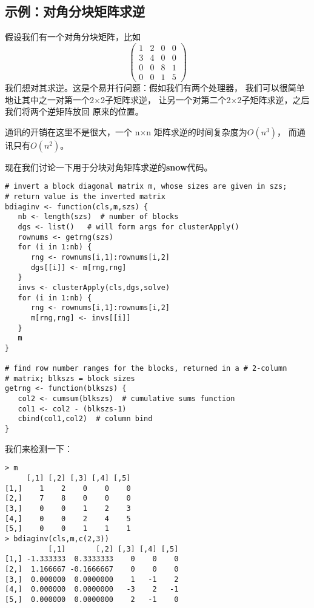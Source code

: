 \subsection{示例：对角分块矩阵求逆}
\label{blkd}

假设我们有一个对角分块矩阵，比如
$$
\left (
   \begin{array}{cccc}
   1 & 2 & 0 & 0 \\
   3 & 4 & 0 & 0 \\
   0 & 0 & 8 & 1 \\
   0 & 0 & 1 & 5
   \end{array}
\right )
$$
我们想对其求逆。这是个易并行问题：假如我们有两个处理器，
我们可以很简单地让其中之一对第一个2$\times$2子矩阵求逆，
让另一个对第二个2$\times$2子矩阵求逆，之后我们将两个逆矩阵放回
原来的位置。

通讯的开销在这里不是很大，一个 n$\times$n 矩阵求逆的时间复杂度为$O(n^3)$，
而通讯只有$O(n^2)$。

现在我们讨论一下用于分块对角矩阵求逆的{\bf snow}代码。

\begin{lstlisting}
# invert a block diagonal matrix m, whose sizes are given in szs;
# return value is the inverted matrix
bdiaginv <- function(cls,m,szs) {
   nb <- length(szs)  # number of blocks
   dgs <- list()   # will form args for clusterApply()
   rownums <- getrng(szs)
   for (i in 1:nb) {
      rng <- rownums[i,1]:rownums[i,2]
      dgs[[i]] <- m[rng,rng]
   }
   invs <- clusterApply(cls,dgs,solve)
   for (i in 1:nb) {
      rng <- rownums[i,1]:rownums[i,2]
      m[rng,rng] <- invs[[i]]
   }
   m
}

# find row number ranges for the blocks, returned in a # 2-column
# matrix; blkszs = block sizes
getrng <- function(blkszs) {
   col2 <- cumsum(blkszs)  # cumulative sums function
   col1 <- col2 - (blkszs-1)
   cbind(col1,col2)  # column bind
}
\end{lstlisting}

我们来检测一下：

\begin{lstlisting}
> m
     [,1] [,2] [,3] [,4] [,5]
[1,]    1    2    0    0    0
[2,]    7    8    0    0    0
[3,]    0    0    1    2    3
[4,]    0    0    2    4    5
[5,]    0    0    1    1    1
> bdiaginv(cls,m,c(2,3))
          [,1]       [,2] [,3] [,4] [,5]
[1,] -1.333333  0.3333333    0    0    0
[2,]  1.166667 -0.1666667    0    0    0
[3,]  0.000000  0.0000000    1   -1    2
[4,]  0.000000  0.0000000   -3    2   -1
[5,]  0.000000  0.0000000    2   -1    0
\end{lstlisting}

